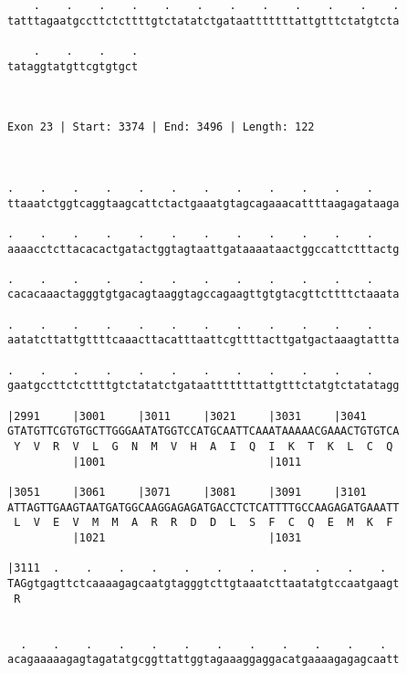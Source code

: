 \documentclass{article}
\begin{document}
\begin{Verbatim}
    .    .    .    .    .    .    .    .    .    .    .    .
tatttagaatgccttctcttttgtctatatctgataatttttttattgtttctatgtcta
                                                            
    .    .    .    .
tataggtatgttcgtgtgct
                    
                    
 
Exon 23 | Start: 3374 | End: 3496 | Length: 122



.    .    .    .    .    .    .    .    .    .    .    .    
ttaaatctggtcaggtaagcattctactgaaatgtagcagaaacattttaagagataaga
                                                            
.    .    .    .    .    .    .    .    .    .    .    .    
aaaacctcttacacactgatactggtagtaattgataaaataactggccattctttactg
                                                            
.    .    .    .    .    .    .    .    .    .    .    .    
cacacaaactagggtgtgacagtaaggtagccagaagttgtgtacgttcttttctaaata
                                                            
.    .    .    .    .    .    .    .    .    .    .    .    
aatatcttattgttttcaaacttacatttaattcgttttacttgatgactaaagtattta
                                                            
.    .    .    .    .    .    .    .    .    .    .    .    
gaatgccttctcttttgtctatatctgataatttttttattgtttctatgtctatatagg
                                                            
|2991     |3001     |3011     |3021     |3031     |3041     
GTATGTTCGTGTGCTTGGGAATATGGTCCATGCAATTCAAATAAAAACGAAACTGTGTCA
 Y  V  R  V  L  G  N  M  V  H  A  I  Q  I  K  T  K  L  C  Q 
          |1001                         |1011               
  
|3051     |3061     |3071     |3081     |3091     |3101     
ATTAGTTGAAGTAATGATGGCAAGGAGAGATGACCTCTCATTTTGCCAAGAGATGAAATT
 L  V  E  V  M  M  A  R  R  D  D  L  S  F  C  Q  E  M  K  F 
          |1021                         |1031               
  
|3111  .    .    .    .    .    .    .    .    .    .    .  
TAGgtgagttctcaaaagagcaatgtagggtcttgtaaatcttaatatgtccaatgaagt
 R                                                          
                                                            
  
  .    .    .    .    .    .    .    .    .    .    .    .  
acagaaaaagagtagatatgcggttattggtagaaaggaggacatgaaaagagagcaatt
                                                            

\end{Verbatim}
\end{document}
